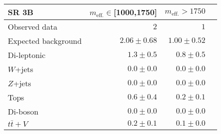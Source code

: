 \begin{tabular*}{\textwidth}{@{\extracolsep{\fill}}lrrr}
\toprule
\textbf{SR 3B} & $m_{\mathrm{eff.}}\in$[1000,1750] & $m_{\mathrm{eff.}}>1750$ \\
\midrule
Observed data          & $2$              & $1$                    \\
\midrule
Expected background         & $2.06 \pm 0.68$          & $1.00 \pm 0.52$              \\
\midrule
        Di-leptonic         & $1.3 \pm 0.5$          & $0.8 \pm 0.5$              \\
        $W$+jets         & $0.0 \pm 0.0$          & $0.0 \pm 0.0$              \\
        $Z$+jets         & $0.0 \pm 0.0$          & $0.0 \pm 0.0$              \\
        Tops         & $0.6 \pm 0.4$          & $0.2 \pm 0.1$              \\
        Di-boson         & $0.0 \pm 0.0$          & $0.0 \pm 0.0$              \\
        $t\bar{t}+V$         & $0.2 \pm 0.1$          & $0.1 \pm 0.0$              \\


\bottomrule
\end{tabular*}




